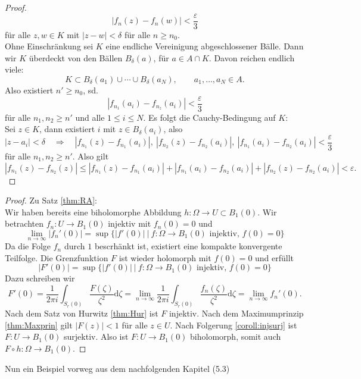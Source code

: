 \documentclass[11pt,titlepage]{article}
\theoremstyle{definition}
\theoremstyle{remark}
\begin{document}
\begin{proof}
		\[ |f_n(z)-f_n(w)|<\frac{\varepsilon}{3} \]
		für alle $z,w\in K$ mit $|z-w|<\delta$ für alle $n\geq n_0$. \\
		Ohne Einschränkung sei $K$ eine endliche Vereinigung abgeschlossener Bälle. Dann wir $K$ überdeckt 
		von den Bällen $B_{\delta}(a)$, für $a\in A\cap K$. Davon reichen endlich viele:
		\[ K\subset B_{\delta}(a_1)\cup \cdots\cup B_{\delta}(a_N), \qquad a_1,\ldots,a_N\in A. \]
		Also existiert $n'\geq n_0$, sd.
		\[ |f_{n_1}(a_i)-f_{n_z}(a_i)|<\frac{\varepsilon}{3} \]
		für alle $n_1,n_2\geq n'$ und alle $1\leq i\leq N$. Es folgt die Cauchy-Bedingung auf $K$: \\
		Sei $z\in K$, dann existiert $i$ mit $z\in B_{\delta}(a_i)$, also
		\[ |z-a_i|<\delta \quad \Rightarrow\quad |f_{n_1}(z)-f_{n_1}(a_i)|,\ |f_{n_2}(z)-f_{n_2}(a_i)|,\ 
		|f_{n_1}(a_i)-f_{n_2}(a_i)|<\frac{\varepsilon}{3} \]
		für alle $n_1,n_2\geq n'$. Also gilt
		\[ |f_{n_1}(z)-f_{n_2}(z)|\leq |f_{n_1}(z)-f_{n_1}(a_i)|+|f_{n_1}(a_i)-f_{n_2}(a_i)|+|f_{n_2}(z)-f_{n_2}(a_i)| < 
		\varepsilon. \]
	\end{proof}
	
	\begin{proof}
		Zu Satz \ref{thm:RA}: \\
		Wir haben bereits eine biholomorphe Abbildung $h:\Omega\to U\subset B_1(0)$. Wir betrachten 
		$f_n: U\to B_1(0)$ injektiv mit $f_n(0)=0$ und
		\[ \lim_{n\to\infty} |f_n'(0)|=\sup \{ |f'(0)|\ \vert\ f:\Omega\to B_1(0)\text{ injektiv, } f(0)=0 \} \]
		Da die Folge $f_n$ durch $1$ bescrhänkt ist, existiert eine kompakte konvergente Teilfolge. 
		Die Grenzfunktion $F$ ist wieder holomorph mit $f(0)=0$ und erfüllt
		\[ |F'(0)|=\sup \{ |f'(0)|\ \vert\ f:\Omega\to B_1(0)\text{ injektiv, } f(0)=0 \} \]
		Dazu schreiben wir
		\[F'(0)=\frac{1}{2\pi i} \int_{S_r(0)} \frac{F(\zeta)}{\zeta^2}\mathrm{d}\zeta =\lim_{n\to\infty} \frac{1}{2\pi i} 
		\int_{S_r(0)}\frac{f_n(\zeta)}{\zeta^2}\mathrm{d}\zeta = \lim_{n\to\infty} f_n'(0). \]
		Nach dem Satz von Hurwitz \ref{thm:Hur} ist $F$ injektiv. Nach dem Maximumprinzip \ref{thm:Maxprin} 
		gilt $|F(z)|<1$ für alle 
		$z\in U$. Nach Folgerung \ref{coroll:injsurj} 
		ist $F:U\to B_1(0)$ surjektiv. Also ist $F:U\to B_1(0)$ biholomorph, somit auch 
		$F\circ h:\Omega\to B_1(0)$.
	\end{proof}
	
	Nun ein Beispiel vorweg aus dem nachfolgenden Kapitel (5.3)
	
\end{document}
